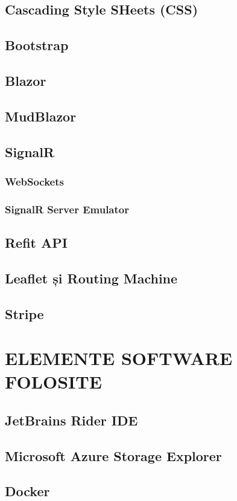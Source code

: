 \documentclass[a4paper,12pt]{report}
\begin{document}
\section{Cascading Style SHeets (CSS)}
\section{Bootstrap}
\section{Blazor}
\section{MudBlazor}
\section{SignalR}
\subsection{WebSockets}
\subsection{SignalR Server Emulator}
\section{Refit API}
\section{Leaflet și Routing Machine}
\section{Stripe}
\newpage
\chapter {ELEMENTE SOFTWARE FOLOSITE}
\section{JetBrains Rider IDE}
\section{Microsoft Azure Storage Explorer}
\section{Docker}
\newpage
\end{document}
